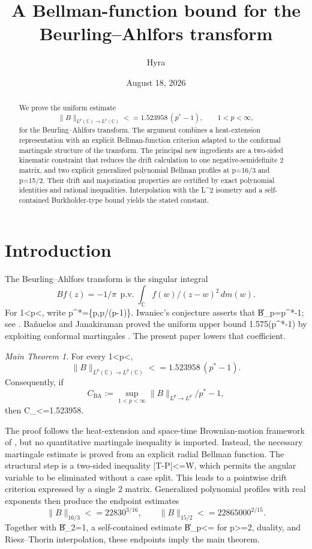 \documentclass[10pt,reqno]{amsart}
\title[A Bellman-function bound for the Beurling--Ahlfors transform]
{A Bellman-function bound for the Beurling--Ahlfors transform}
\author{Hyra}
\date{August 18, 2026}
\def\({}\def\){}%
\def\frac#1#2{#1/#2}%
\def\ge{>=}\def\le{<=}%
\newcommand{\pv}{\operatorname{p.v.}}
\theoremstyle{definition}
\theoremstyle{remark}
\newtheorem*{maintheorem}{Main Theorem}
\begin{document}
\begin{abstract}
We prove the uniform estimate
\[
 \|B\|_{L^p(\mathbb C)\to L^p(\mathbb C)}
 \le 1.523958\,(p^*-1),\qquad 1<p<\infty,
\]
for the Beurling--Ahlfors transform.  The argument combines a heat-extension
representation with an explicit Bellman-function criterion adapted to the
conformal martingale structure of the transform.  The principal new ingredients
are a two-sided kinematic constraint that reduces the drift calculation to one
negative-semidefinite \(2\) matrix, and two explicit generalized
polynomial Bellman profiles at \(p=16/3\) and \(p=15/2\).  Their drift and
majorization properties are certified by exact polynomial identities and rational
inequalities.  Interpolation with the \(L^2\) isometry and a self-contained
Burkholder-type bound yields the stated constant.
\end{abstract}

\maketitle

\section*{Introduction}
The Beurling--Ahlfors transform is the singular integral
\[
 Bf(z)=-\frac1\pi\,\pv\!\int_{\mathbb C}
       \frac{f(w)}{(z-w)^2}\,dm(w).
\]
For \(1<p<\infty\), write
\(p^*=\max\{p,p/(p-1)\}\).  Iwaniec's conjecture asserts that
\(\|B\|_p=p^*-1\); see \cite{Iwaniec82}.  Bañuelos and Janakiraman proved the
uniform upper bound \(1.575(p^*-1)\) by exploiting conformal martingales
\cite{BanuelosJanakiraman08}.  The present paper lowers that coefficient.

\begin{maintheorem}\label{thm:main}
For every \(1<p<\infty\),
\[
 \|B\|_{L^p(\mathbb C)\to L^p(\mathbb C)}
 \le 1.523958\,(p^*-1).
\]
Consequently, if
\[
 C_{\mathrm{BA}}:=\sup_{1<p<\infty}
 \frac{\|B\|_{L^p\to L^p}}{p^*-1},
\]
then \(C_{}\le1.523958\).
\end{maintheorem}

The proof follows the heat-extension and space-time Brownian-motion framework
of \cite{BanuelosMendez03}, but no quantitative martingale inequality is imported.
Instead, the necessary martingale estimate is proved from an explicit radial
Bellman function.  The structural step is a two-sided inequality
\(|T-P|\le W\), which permits the angular variable to be eliminated without a
case split.  This leads to a pointwise drift criterion expressed by a single
\(2\) matrix.  Generalized polynomial profiles with real exponents then
produce the endpoint estimates
\[
 \|B\|_{16/3}\le22830^{3/16},\qquad
 \|B\|_{15/2}\le22865000^{2/15}.
\]
Together with \(\|B\|_2=1\), a self-contained estimate
\(\|B\|_p\le{}\) for \(p\ge2\), duality, and
Riesz--Thorin interpolation, these endpoints imply the main theorem.
\end{document}
